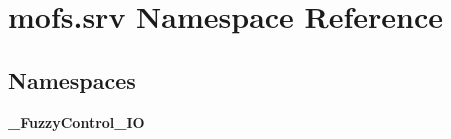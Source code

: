 \section{mofs.\-srv Namespace Reference}
\label{namespacemofs_1_1srv}
\subsection*{Namespaces}
\begin{DoxyCompactItemize}
\item 
{\bf \-\_\-\-Fuzzy\-Control\-\_\-\-I\-O}
\end{DoxyCompactItemize}

